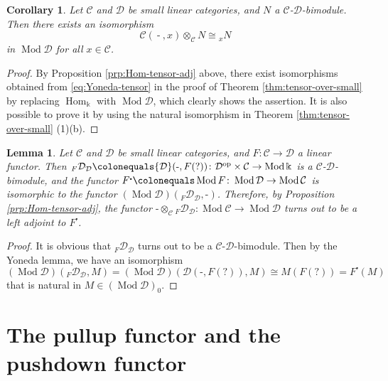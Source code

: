 \documentclass{surv-l}
\numberwithin{equation}{chapter}
\numberwithin{figure}{chapter}
\theoremstyle{plain}
\newtheorem{lem}[thm]{Lemma}
\newtheorem{cor}[thm]{Corollary}
\theoremstyle{definition}
\theoremstyle{remark}
\DeclareMathOperator{\Hom}{Hom}
\DeclareMathOperator{\Mod}{Mod}
\DeclareMathOperator{\blank}{-}
\begin{document}
\begin{cor}\label{cor:Yoneda-tensor}
Let ${\mathcal{C}}$ and ${\mathcal{D}}$ be small linear categories, and $N$ a ${\mathcal{C}}$-${\mathcal{D}}$-bimodule.
Then there exists an isomorphism
\[
{\mathcal{C}}(\blank, x) \otimes_{{\mathcal{C}}} N \cong {}_xN
\]
in $\Mod {\mathcal{D}}$ for all $x \in {\mathcal{C}}$.
\end{cor}

\begin{proof}
By Proposition \ref{prp:Hom-tensor-adj} above,
there exist isomorphisms obtained from \eqref{eq:Yoneda-tensor} in the proof of
Theorem \ref{thm:tensor-over-small} by replacing $\Hom_\Bbbk$ with $\Mod{\mathcal{D}}$,
which clearly shows the assertion.
It is also possible to prove it by using the natural isomorphism in Theorem \ref{thm:tensor-over-small} (1)(b).
\end{proof}

\begin{lem}\label{lem:left-Kan}
Let ${\mathcal{C}}$ and ${\mathcal{D}}$ be small linear categories, and $F \colon {\mathcal{C}} \to {\mathcal{D}}$ a linear functor.
Then ${}_F{\mathcal{D}}_{\mathcal{D}}\colonequals  {\mathcal{D}}(\text{-}, F(?)) \colon {\mathcal{D}}^{\mathrm{op}} \times {\mathcal{C}} \to \Mod\Bbbk$
is a ${\mathcal{C}}$-${\mathcal{D}}$-bimodule, and
the functor $F^{\centerdot}\colonequals   \Mod F \colon \Mod {\mathcal{D}} \to \Mod {\mathcal{C}}$
is isomorphic to the functor $(\Mod{\mathcal{D}})({}_F{\mathcal{D}}_{\mathcal{D}}, \text{-})$.
Therefore, by Proposition \ref{prp:Hom-tensor-adj},
the functor $\text{-}\otimes_{\mathcal{C}} {}_F{\mathcal{D}}_{\mathcal{D}} \colon\! \Mod {\mathcal{C}}\! \to \Mod {\mathcal{D}}$
turns out to be a left adjoint to $F^{\centerdot}$.
\end{lem}

\begin{proof}
It is obvious that ${}_F{\mathcal{D}}_{\mathcal{D}}$ turns out to be a ${\mathcal{C}}$-${\mathcal{D}}$-bimodule.
Then by the Yoneda lemma,
we have an isomorphism
\[
(\Mod{\mathcal{D}})({}_F{\mathcal{D}}_{\mathcal{D}}, M) = (\Mod{\mathcal{D}})({\mathcal{D}}(\text{-}, F(?)), M) \cong M(F(?)) = F^{\centerdot}(M)
\]
that is natural in $M \in (\Mod{\mathcal{D}})_0$.
\end{proof}

\section{The pullup functor and the pushdown functor}\label{sec:pullup-pushdown}
\end{document}
